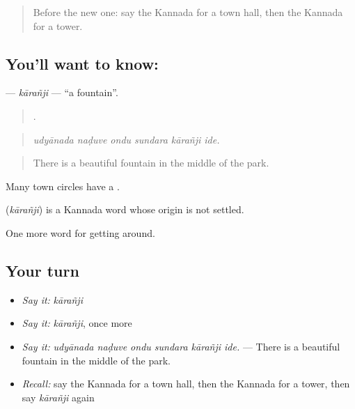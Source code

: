 \label{lesson:KA-C456-karanji}



\begin{quote}
Before the new one: say the Kannada for a town hall, then the Kannada for a tower.
\end{quote}

\subsection*{You'll want to know: }
\textbf{} — \emph{kārañji} — \textquotedblleft{}a fountain\textquotedblright{}.

\begin{quote}
     .
\end{quote}

\begin{quote}
\emph{udyānada naḍuve ondu sundara kārañji ide.}
\end{quote}

\begin{quote}
There is a beautiful fountain in the middle of the park.
\end{quote}

Many town circles have a .

\begin{cousinweb}
\textbf{} (\emph{kārañji}) is a Kannada word whose origin is not settled.
\end{cousinweb}

\begin{grammarlens}[title={What you've built}]
One more word for getting around.
\end{grammarlens}

\subsection*{Your turn}
\begin{itemize}
\raggedright
  \item \emph{Say it:} \emph{kārañji}
  \item \emph{Say it:} \emph{kārañji}, once more
  \item \emph{Say it:} \emph{udyānada naḍuve ondu sundara kārañji ide.} — There is a beautiful fountain in the middle of the park.
  \item \emph{Recall:} say the Kannada for a town hall, then the Kannada for a tower, then say \emph{kārañji} again
\end{itemize}

